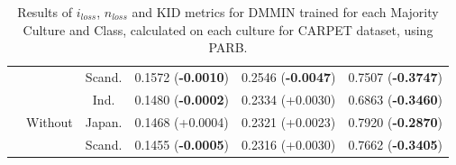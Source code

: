 \begin{table}[]
\begin{tabular}{c|c|c|c|c|c}
 &  & Scand. & 0.1572 (\textbf{-0.0010})       & 0.2546 (\textbf{-0.0047})       & 0.7507 (\textbf{-0.3747})   \\
\hhline{~-----}
 & \multirow{3}{*}{Without} &Ind.     & 0.1480 (\textbf{-0.0002})       & 0.2334 (+0.0030)       & 0.6863 (\textbf{-0.3460})   \\
 &  & Japan.   & 0.1468 (+0.0004)       & 0.2321 (+0.0023)       & 0.7920 (\textbf{-0.2870})  \\
 &  & Scand. & 0.1455 (\textbf{-0.0005})       & 0.2316 (+0.0030)       & 0.7662 (\textbf{-0.3405}) \\  
\bottomrule
    \end{tabular}
    \caption{Results of $i_{loss}$, $n_{loss}$ and KID metrics for DMMIN trained for each Majority Culture and Class, calculated on each culture for CARPET dataset, using PARB.}
    \label{ch3:tab:ris:dmmin:parb:carpet}
\end{table}


